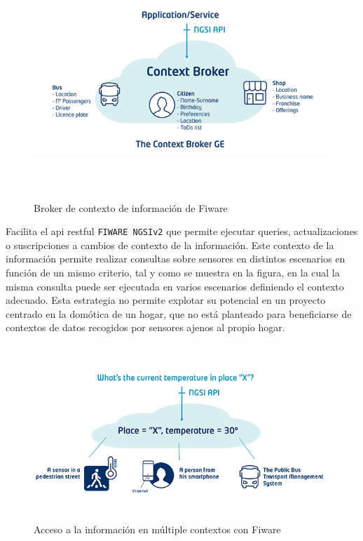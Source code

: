 \vspace{0.5cm}
\begin{figure}[hbt!]
\label{fiwarecontext}
\centering
\includegraphics[height=3.5in]{figures/fiware_context_broker.png}
\caption[Broker de contexto de información de Fiware]{Broker de contexto de información de Fiware}
\end{figure}

Facilita el \gls{api} restful \verb|FIWARE NGSIv2| que permite ejecutar queries, actualizaciones o suscripciones a cambios de contexto de la información. Este contexto de la información permite realizar consultas sobre sensores en distintos escenarios en función de un mismo criterio, tal y como se muestra en la figura, en la cual la misma consulta puede ser ejecutada en varios escenarios definiendo el contexto adecuado. Esta estrategia no permite explotar su potencial en un proyecto centrado en la domótica de un hogar, que no está planteado para beneficiarse de contextos de datos recogidos por sensores ajenos al propio hogar.

\vspace{0.5cm}
\begin{figure}[hbt!]
\label{fiwarechangecontext}
\centering
\includegraphics[height=2.6in]{figures/fiware_context_change.png}
\caption[Acceso a la información en múltiple contextos con Fiware]{Acceso a la información en múltiple contextos con Fiware}
\end{figure}


